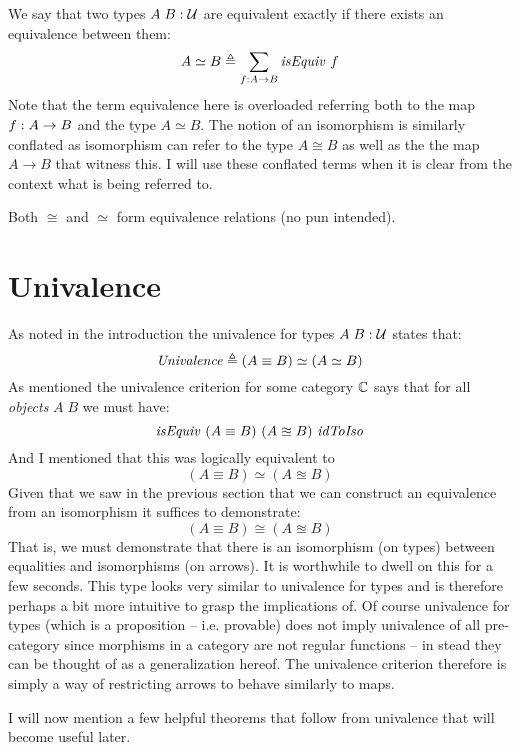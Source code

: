 We say that two types $A\;B \mathrel{:} \mathcal{U}$ are equivalent exactly if there exists an
equivalence between them:
%
\begin{equation}
\label{eq:equivalence}
A \simeq B \defeq \sum_{f \tp A \to B} \isEquiv\ f
\end{equation}
%
Note that the term equivalence here is overloaded referring both to the map $f
\mathrel{:} A \to B$ and the type $A \simeq B$. The notion of an isomorphism is
similarly conflated as isomorphism can refer to the type $A \cong B$ as well as
the the map $A \to B$ that witness this. I will use these conflated terms when
it is clear from the context what is being referred to.

Both $\cong$ and $\simeq$ form equivalence relations (no pun intended).

\section{Univalence}
\label{sec:univalence}
As noted in the introduction the univalence for types $A\; B \mathrel{:} \mathcal{U}$ states
that:
%
$$
\mathit{Univalence} \mathrel{\triangleq} (A \equiv B) \simeq (A \simeq B)
$$
%
As mentioned the univalence criterion for some category $\mathbb{C}$ says that for all
\emph{objects} $A\;B$ we must have:
$$
\isEquiv\ (A \equiv B)\ (A \approxeq B)\ \idToIso
$$
And I mentioned that this was logically equivalent to
%
$$
(A \equiv B) \simeq (A \approxeq B)
$$
%
Given that we saw in the previous section that we can construct an equivalence
from an isomorphism it suffices to demonstrate:
%
$$
(A \equiv B) \cong (A \approxeq B)
$$
%
That is, we must demonstrate that there is an isomorphism (on types) between
equalities and isomorphisms (on arrows). It is worthwhile to dwell on this for a
few seconds. This type looks very similar to univalence for types and is
therefore perhaps a bit more intuitive to grasp the implications of. Of course
univalence for types (which is a proposition -- i.e. provable) does not imply
univalence of all pre-category since morphisms in a category are not regular
functions -- in stead they can be thought of as a generalization hereof. The univalence criterion therefore is simply a way of restricting arrows
to behave similarly to maps.

I will now mention a few helpful theorems that follow from univalence that will
become useful later.

